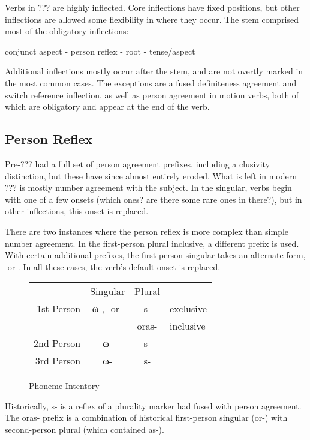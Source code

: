 \documentclass[12pt]{book} %
\begin{document}
Verbs in ??? are highly inflected.
Core inflections have fixed positions, but other inflections are allowed some flexibility in where they occur.
The stem comprised most of the obligatory inflections:
\begin{center}
    conjunct aspect - person reflex - root - tense/aspect
\end{center}
Additional inflections {\color{red}mostly} occur after the stem, and are not overtly marked in the most common cases.
The exceptions are a fused definiteness agreement and switch reference inflection, as well as person agreement in motion verbs, both of which are obligatory and appear at the end of the verb.

\subsection{Person Reflex}

Pre-??? had a full set of person agreement prefixes, including a clusivity distinction, but these have since almost entirely eroded.
What is left in modern ??? is mostly number agreement with the subject.
In the singular, verbs begin with one of a few onsets {\color{red} (which ones? are there some rare ones in there?)}, but in other inflections, this onset is replaced.

There are two instances where the person reflex is more complex than simple number agreement.
In the first-person plural inclusive, a different prefix is used.
With certain additional prefixes, the first-person singular takes an alternate form, -or-.
In all these cases, the verb's default onset is replaced.

\begin{figure}[H]
\centering
    \begin{tabular}{rccl}
                & Singular  & Plural                \\
    1st Person  & ω-, -or-  & s-        & exclusive \\
                &           & oras- & inclusive \\
    2nd Person  & ω-        & s-                    \\
    3rd Person  & ω-        & s-                    \\
    \end{tabular}
\caption{Phoneme Intentory}\label{t:phonemes}
\end{figure}

{\color{cyan}
Historically, s- is a reflex of a plurality marker had fused with person agreement.
The oras- prefix is a combination of historical first-person singular (or-) with second-person plural (which contained as-).
}
\end{document}
